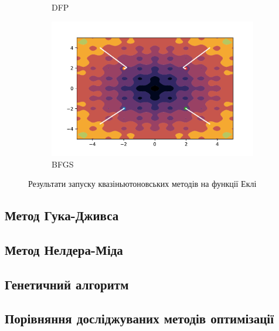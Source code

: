 \begin{figure}[h!]
\begin{subfigure}{0.5\textwidth}
        \caption{DFP}
    \end{subfigure}
    \begin{subfigure}{0.5\textwidth}
        \includegraphics[width=\textwidth, trim=1.4cm 0.5cm 1.3cm 1cm, clip]{assets/BFGS/ackley.pdf}
        \caption{BFGS}
    \end{subfigure}
    \caption{Результати запуску квазіньютоновських методів на функції Еклі}
\end{figure}

\pagebreak
\subsection*{Метод Гука-Дживса}

\subsection*{Метод Нелдера-Міда}

\subsection*{Генетичний алгоритм}

\pagebreak
\subsection*{Порівняння досліджуваних методів оптимізації}

